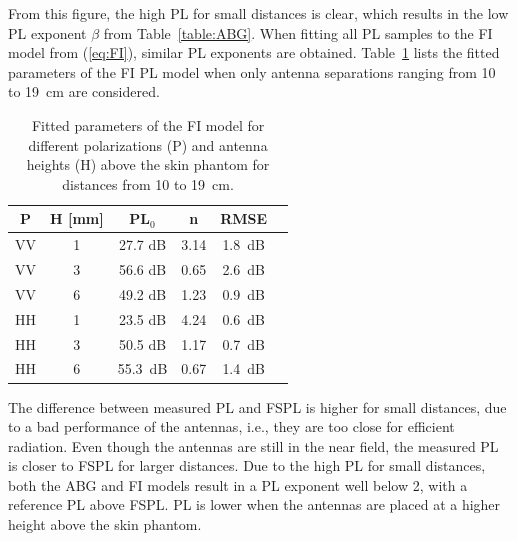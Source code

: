 \documentclass[manuscript]{rsl}
\begin{document}
From this figure, the high PL for small distances is clear, which results in the low PL exponent $\beta$ from Table~\ref{table:ABG}.
When fitting all PL samples to the FI model from (\ref{eq:FI}), similar PL exponents are obtained. 
Table~\ref{table:FI} lists the fitted parameters of the FI PL model when only antenna separations ranging from 10 to 19~cm are considered.
\begin{table}[tb]
  \caption{Fitted parameters of the FI model for different polarizations (P) and antenna heights (H) above the skin phantom for distances from 10 to 19~cm.}
  \label{table:FI}
  \begin{center}
    \begin{tabular}{cc|cccc}
      P & H [mm] & PL$_0$ & n& RMSE \\
      \hline
      VV & 1 & 27.7 dB & 3.14 & 1.8~dB \\
      VV & 3 & 56.6 dB & 0.65 & 2.6~dB \\
      VV & 6 & 49.2 dB & 1.23 & 0.9~dB \\
      HH & 1 & 23.5 dB & 4.24 & 0.6~dB \\
      HH & 3 & 50.5 dB & 1.17 & 0.7~dB \\
      HH & 6 & 55.3~dB & 0.67 & 1.4~dB \\
    \end{tabular}
  \end{center}
\end{table}

The difference between measured PL and FSPL is higher for small distances, due to a bad performance of the antennas, i.e., they are too close for efficient radiation. 
Even though the antennas are still in the near field, the measured PL is closer to FSPL for larger distances. 
Due to the high PL for small distances, both the ABG and FI models result in a PL exponent well below 2, with a reference PL above FSPL. 
PL is lower when the antennas are placed at a higher height above the skin phantom. 
\end{document}
